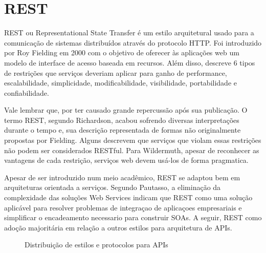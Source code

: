 \section{REST}

REST ou Representational State Transfer é um estilo arquitetural usado para a comunicação de sistemas distribuídos através do protocolo HTTP. Foi introduzido por Roy Fielding em 2000 com o objetivo de oferecer às aplicações web um modelo de interface de acesso baseada em recursos. Além disso, descreve 6 tipos de restrições que serviços deveriam aplicar para ganho de performance, escalabilidade, simplicidade, modificabilidade, visibilidade, portabilidade e confiabilidade.

Vale lembrar que, por ter causado grande repercussão após sua publicação. O termo REST, segundo Richardson, acabou sofrendo diversas interpretações durante o tempo e, sua descrição representada de formas não originalmente propostas por Fielding. Alguns descrevem que serviços que violam essas restrições não podem ser considerados RESTful. Para Wildermuth, apesar de reconhecer as vantagens de cada restrição, serviços web devem usá-los de forma pragmatica. \cite{RichardsonEtAl2013} \cite{Wildermuth2015}

Apesar de ser introduzido num meio acadêmico, REST se adaptou bem em arquiteturas orientada a serviços. Segundo Pautasso, a eliminação da complexidade das soluções Web Services indicam que REST como uma solução aplicável para resolver problemas de integraçao de aplicaçoes empresariais e simplificar o encadeamento necessario para construir SOAs. A seguir, REST como adoção majoritária em relação a outros estilos para arquitetura de APIs. \cite{PautassoEtAl2008}

\begin{figure}[H]
  \centering
  \caption{Distribuição de estilos e protocolos para APIs}
\end{figure}

